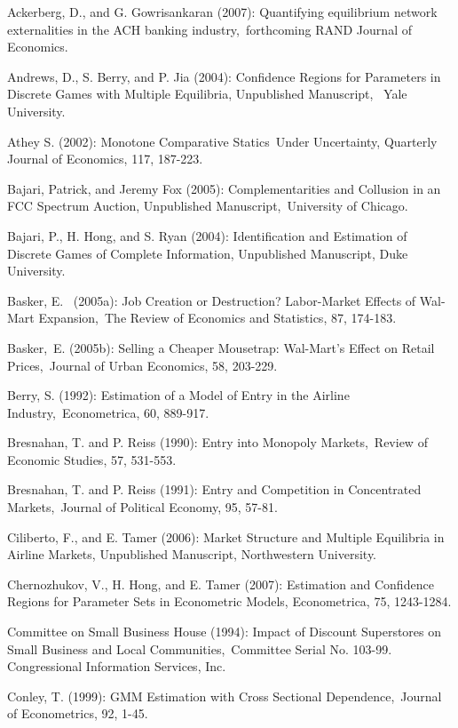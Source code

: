\documentclass[notitlepage,onecolumn,11pt]{article}
\begin{document}
\begin{thebibliography}{99}
\bibitem{} Ackerberg, D., and G. Gowrisankaran (2007): Quantifying
equilibrium network externalities in the ACH banking industry,\ forthcoming
RAND Journal of Economics.

\bibitem{} Andrews, D., S. Berry, and P. Jia (2004): Confidence Regions for
Parameters in Discrete Games with Multiple Equilibria, Unpublished
Manuscript, \ Yale University.

\bibitem{} Athey S. (2002): Monotone Comparative Statics\ Under Uncertainty,
Quarterly Journal of Economics, 117, 187-223.

\bibitem{} Bajari, Patrick, and Jeremy Fox (2005): Complementarities and
Collusion in an FCC Spectrum Auction, Unpublished Manuscript,\ University of
Chicago.

 Bajari, P., H. Hong, and S. Ryan (2004):
Identification and Estimation of Discrete Games of Complete Information,
Unpublished Manuscript, Duke University.

\bibitem{} Basker, E. \ (2005a): Job Creation or Destruction? Labor-Market
Effects of Wal-Mart Expansion,\ The Review of Economics and Statistics, 87,
174-183.

 Basker,\ E. (2005b): Selling a Cheaper Mousetrap: Wal-Mart's
Effect on Retail Prices,\ Journal of Urban Economics, 58, 203-229.

\bibitem{} Berry, S. (1992): Estimation of a Model of Entry in the Airline
Industry,\ Econometrica, 60, 889-917.

\bibitem{} Bresnahan, T. and P. Reiss (1990): Entry into Monopoly Markets,\
Review of Economic Studies, 57, 531-553.

 Bresnahan, T. and P. Reiss (1991): Entry and Competition in
Concentrated Markets,\ Journal of Political Economy, 95, 57-81.

\bibitem{} Ciliberto, F., and E. Tamer (2006): Market Structure and Multiple
Equilibria in Airline Markets, Unpublished Manuscript, Northwestern
University.

 Chernozhukov, V., H. Hong, and E. Tamer (2007): Estimation and
Confidence Regions for Parameter Sets in Econometric Models, Econometrica,
75, 1243-1284.

\bibitem{} Committee on Small Business House (1994): Impact of Discount
Superstores on Small Business and Local Communities,\ Committee Serial No.
103-99. Congressional Information Services, Inc.

 Conley, T. (1999): GMM Estimation with Cross Sectional
Dependence,\ Journal of Econometrics, 92, 1-45.


\end{thebibliography}
\end{document}
